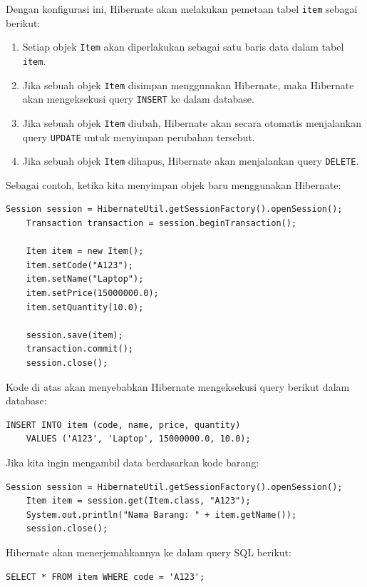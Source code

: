 Dengan konfigurasi ini, Hibernate akan melakukan pemetaan tabel \texttt{item} sebagai berikut:
\begin{enumerate}
	\item Setiap objek \texttt{Item} akan diperlakukan sebagai satu baris data dalam tabel \texttt{item}.
	\item Jika sebuah objek \texttt{Item} disimpan menggunakan Hibernate, maka Hibernate akan mengeksekusi query \texttt{INSERT} ke dalam database.
	\item Jika sebuah objek \texttt{Item} diubah, Hibernate akan secara otomatis menjalankan query \texttt{UPDATE} untuk menyimpan perubahan tersebut.
	\item Jika sebuah objek \texttt{Item} dihapus, Hibernate akan menjalankan query \texttt{DELETE}.
\end{enumerate}

Sebagai contoh, ketika kita menyimpan objek baru menggunakan Hibernate:

\begin{lstlisting}[style=JavaStyle]
	Session session = HibernateUtil.getSessionFactory().openSession();
	Transaction transaction = session.beginTransaction();
	
	Item item = new Item();
	item.setCode("A123");
	item.setName("Laptop");
	item.setPrice(15000000.0);
	item.setQuantity(10.0);
	
	session.save(item);
	transaction.commit();
	session.close();
\end{lstlisting}

Kode di atas akan menyebabkan Hibernate mengeksekusi query berikut dalam database:

\begin{lstlisting}[style=sql]
	INSERT INTO item (code, name, price, quantity) 
	VALUES ('A123', 'Laptop', 15000000.0, 10.0);
\end{lstlisting}

Jika kita ingin mengambil data berdasarkan kode barang:

\begin{lstlisting}[style=JavaStyle]
	Session session = HibernateUtil.getSessionFactory().openSession();
	Item item = session.get(Item.class, "A123");
	System.out.println("Nama Barang: " + item.getName());
	session.close();
\end{lstlisting}

Hibernate akan menerjemahkannya ke dalam query SQL berikut:

\begin{lstlisting}[style=sql]
	SELECT * FROM item WHERE code = 'A123';
\end{lstlisting}

